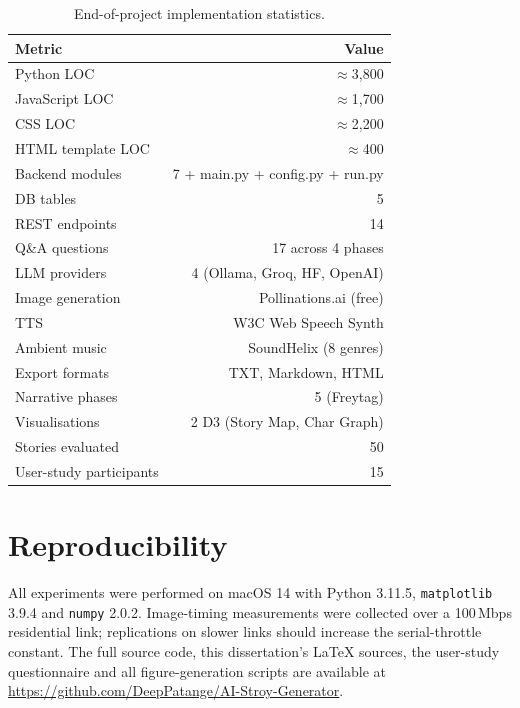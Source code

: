 \begin{appendices}
\begin{table}[ht]
\caption{End-of-project implementation statistics.}
\centering
\renewcommand{\arraystretch}{1.1}
\begin{tabular}{@{}lr@{}}
\toprule
\textbf{Metric}                      & \textbf{Value} \\
\midrule
Python LOC                            & $\approx$3{,}800 \\
JavaScript LOC                        & $\approx$1{,}700 \\
CSS LOC                               & $\approx$2{,}200 \\
HTML template LOC                     & $\approx$400 \\
Backend modules                       & 7 + main.py + config.py + run.py \\
DB tables                             & 5 \\
REST endpoints                        & 14 \\
Q\&A questions                        & 17 across 4 phases \\
LLM providers                         & 4 (Ollama, Groq, HF, OpenAI) \\
Image generation                      & Pollinations.ai (free) \\
TTS                                   & W3C Web Speech Synth \\
Ambient music                         & SoundHelix (8 genres) \\
Export formats                        & TXT, Markdown, HTML \\
Narrative phases                      & 5 (Freytag) \\
Visualisations                        & 2 D3 (Story Map, Char Graph) \\
Stories evaluated                     & 50 \\
User-study participants               & 15 \\
\bottomrule
\end{tabular}
\end{table}

\chapter{Reproducibility}

All experiments were performed on macOS 14 with Python 3.11.5,
\texttt{matplotlib} 3.9.4 and \texttt{numpy} 2.0.2. Image-timing
measurements were collected over a 100\,Mbps residential link;
replications on slower links should increase the serial-throttle
constant. The full source code, this dissertation's LaTeX sources,
the user-study questionnaire and all figure-generation scripts are
available at \url{https://github.com/DeepPatange/AI-Stroy-Generator}.
\end{appendices}
